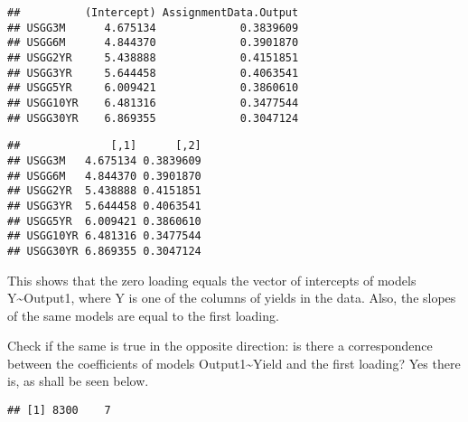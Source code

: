 \documentclass[]{article}
\newenvironment{Shaded}{\begin{snugshade}}{\end{snugshade}}
\newcommand{\KeywordTok}[1]{\textcolor[rgb]{0.13,0.29,0.53}{\textbf{#1}}}
\newcommand{\DecValTok}[1]{\textcolor[rgb]{0.00,0.00,0.81}{#1}}
\newcommand{\ControlFlowTok}[1]{\textcolor[rgb]{0.13,0.29,0.53}{\textbf{#1}}}
\newcommand{\OperatorTok}[1]{\textcolor[rgb]{0.81,0.36,0.00}{\textbf{#1}}}
\newcommand{\NormalTok}[1]{#1}
\begin{document}
\begin{verbatim}
##          (Intercept) AssignmentData.Output
## USGG3M      4.675134             0.3839609
## USGG6M      4.844370             0.3901870
## USGG2YR     5.438888             0.4151851
## USGG3YR     5.644458             0.4063541
## USGG5YR     6.009421             0.3860610
## USGG10YR    6.481316             0.3477544
## USGG30YR    6.869355             0.3047124
\end{verbatim}

\begin{Shaded}
\end{Shaded}

\begin{verbatim}
##              [,1]      [,2]
## USGG3M   4.675134 0.3839609
## USGG6M   4.844370 0.3901870
## USGG2YR  5.438888 0.4151851
## USGG3YR  5.644458 0.4063541
## USGG5YR  6.009421 0.3860610
## USGG10YR 6.481316 0.3477544
## USGG30YR 6.869355 0.3047124
\end{verbatim}

This shows that the zero loading equals the vector of intercepts of
models Y\textasciitilde{}Output1, where Y is one of the columns of
yields in the data. Also, the slopes of the same models are equal to the
first loading.

Check if the same is true in the opposite direction: is there a
correspondence between the coefficients of models
Output1\textasciitilde{}Yield and the first loading? Yes there is, as
shall be seen below.

\begin{Shaded}
\end{Shaded}

\begin{verbatim}
## [1] 8300    7
\end{verbatim}
\end{document}
